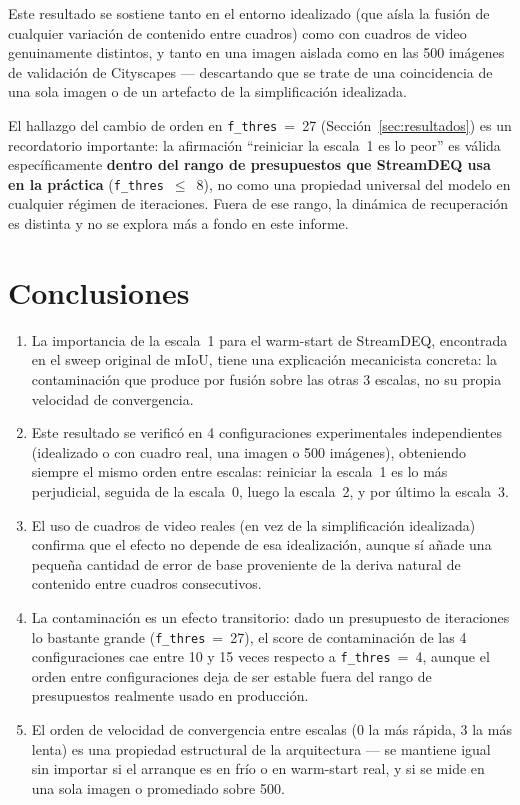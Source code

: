 \documentclass[11pt,a4paper]{article}
\newcommand{\code}[1]{\texttt{#1}}
\begin{document}
Este resultado se sostiene tanto en el entorno idealizado (que aísla la fusión de cualquier
variación de contenido entre cuadros) como con cuadros de video genuinamente distintos, y tanto en
una imagen aislada como en las 500 imágenes de validación de Cityscapes --- descartando que se trate
de una coincidencia de una sola imagen o de un artefacto de la simplificación idealizada.

El hallazgo del cambio de orden en \code{f\_thres}~=~27 (Sección~\ref{sec:resultados}) es un
recordatorio importante: la afirmación ``reiniciar la escala~1 es lo peor'' es válida
específicamente \textbf{dentro del rango de presupuestos que StreamDEQ usa en la práctica}
(\code{f\_thres}~$\leq$~8), no como una propiedad universal del modelo en cualquier régimen de
iteraciones. Fuera de ese rango, la dinámica de recuperación es distinta y no se explora más a
fondo en este informe.


\section{Conclusiones}

\begin{enumerate}[leftmargin=*]
  \item La importancia de la escala~1 para el warm-start de StreamDEQ, encontrada en el sweep
    original de mIoU, tiene una explicación mecanicista concreta: la contaminación que produce por
    fusión sobre las otras 3 escalas, no su propia velocidad de convergencia.
  \item Este resultado se verificó en 4 configuraciones experimentales independientes (idealizado
    o con cuadro real, una imagen o 500 imágenes), obteniendo siempre el mismo orden entre escalas:
    reiniciar la escala~1 es lo más perjudicial, seguida de la escala~0, luego la escala~2, y por
    último la escala~3.
  \item El uso de cuadros de video reales (en vez de la simplificación idealizada) confirma que el
    efecto no depende de esa idealización, aunque sí añade una pequeña cantidad de error de base
    proveniente de la deriva natural de contenido entre cuadros consecutivos.
  \item La contaminación es un efecto transitorio: dado un presupuesto de iteraciones lo bastante
    grande (\code{f\_thres}~=~27), el score de contaminación de las 4 configuraciones cae entre 10 y
    15 veces respecto a \code{f\_thres}~=~4, aunque el orden entre configuraciones deja de ser
    estable fuera del rango de presupuestos realmente usado en producción.
  \item El orden de velocidad de convergencia entre escalas (0 la más rápida, 3 la más lenta) es una
    propiedad estructural de la arquitectura --- se mantiene igual sin importar si el arranque es en
    frío o en warm-start real, y si se mide en una sola imagen o promediado sobre 500.
\end{enumerate}
\end{document}

